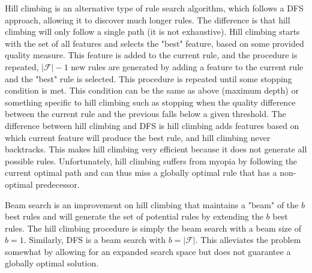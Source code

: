  Hill climbing is an alternative type of rule search algorithm, which follows a DFS approach, allowing it to discover much longer rules. The difference is that hill climbing will only follow a single path (it is not exhaustive). Hill climbing starts with the set of all features and selects the "best" feature, based on some provided quality measure. This feature is added to the current rule, and the procedure is repeated, $|\mathcal{F}|-1$ new rules are generated by adding a feature to the current rule and the "best" rule is selected. This procedure is repeated until some stopping condition is met. This condition can be the same as above (maximum depth) or something specific to hill climbing such as stopping when the quality difference between the current rule and the previous falls below a given threshold. The difference between hill climbing and DFS is hill climbing adds features based on which current feature will produce the best rule, and hill climbing never backtracks. This makes hill climbing very efficient because it does not generate all possible rules.
Unfortunately, hill climbing suffers from myopia by following the current optimal path and can thus miss a globally optimal rule that has a non-optimal predecessor.

Beam search is an improvement on hill climbing that maintains a "beam" of the $b$ best rules and will generate the set of potential rules by extending the $b$ best rules. The hill climbing procedure is simply the beam search with a beam size of $b=1$. Similarly, DFS is a beam search with $b=|\mathcal{F}|$. This alleviates the problem somewhat by allowing for an expanded search space but does not guarantee a globally optimal solution.





